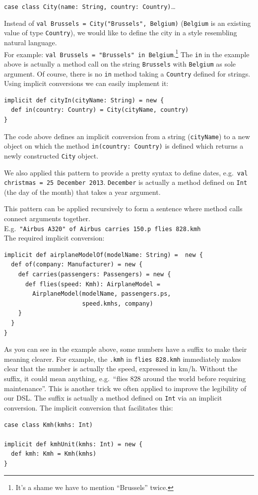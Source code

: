 \documentclass[a4paper]{article}
\newcommand{\cc}[1]{\texttt{#1}}
\renewcommand{\sc}[1]{\lstinline{#1}}
\begin{document}
\sc{case class City(name: String, country: Country)}\ldots{}

Instead of \sc{val Brussels = City("Brussels", Belgium)} (\cc{Belgium} is an existing value of type \cc{Country}), we would like to define the city in a style resembling natural language.\\
For example: \sc{val Brussels = "Brussels" in Belgium}.\footnote{It's a shame we have to mention ``Brussels'' twice.}
The \sc{in} in the example above is actually a method call on the string \cc{Brussels} with \cc{Belgium} as sole argument.
Of course, there is no \sc{in} method taking a \cc{Country} defined for strings.
Using implicit conversions we can easily implement it:

\begin{lstlisting}
implicit def cityIn(cityName: String) = new {
  def in(country: Country) = City(cityName, country)
}
\end{lstlisting}

The code above defines an implicit conversion from a string (\sc{cityName}) to a new object on which the method \sc{in(country: Country)} is defined which returns a newly constructed \cc{City} object.

We also applied this pattern to provide a pretty syntax to define dates, e.g.\ \sc{val christmas = 25 December 2013}.
\cc{December} is actually a method defined on \cc{Int} (the day of the month) that takes a year argument.

This pattern can be applied recursively to form a sentence where method calls connect arguments together.\\
E.g.\ \sc{"Airbus A320" of Airbus carries 150.p flies 828.kmh}\\
The required implicit conversion:

\begin{lstlisting}
implicit def airplaneModelOf(modelName: String) =  new {
  def of(company: Manufacturer) = new {
    def carries(passengers: Passengers) = new {
      def flies(speed: Kmh): AirplaneModel =
        AirplaneModel(modelName, passengers.ps,
                      speed.kmhs, company)
    }
  }
}
\end{lstlisting}

As you can see in the example above, some numbers have a suffix to make their meaning clearer.
For example, the \sc{.kmh} in \sc{flies 828.kmh} immediately makes clear that the number is actually the speed, expressed in km/h.
Without the suffix, it could mean anything, e.g.\ ``flies 828 around the world before requiring maintenance''.
This is another trick we often applied to improve the legibility of our DSL.
The suffix is actually a method defined on \cc{Int} via an implicit conversion.
The implicit conversion that facilitates this:
\begin{lstlisting}
case class Kmh(kmhs: Int)

implicit def kmhUnit(kmhs: Int) = new {
  def kmh: Kmh = Kmh(kmhs)
}
\end{lstlisting}
\end{document}
